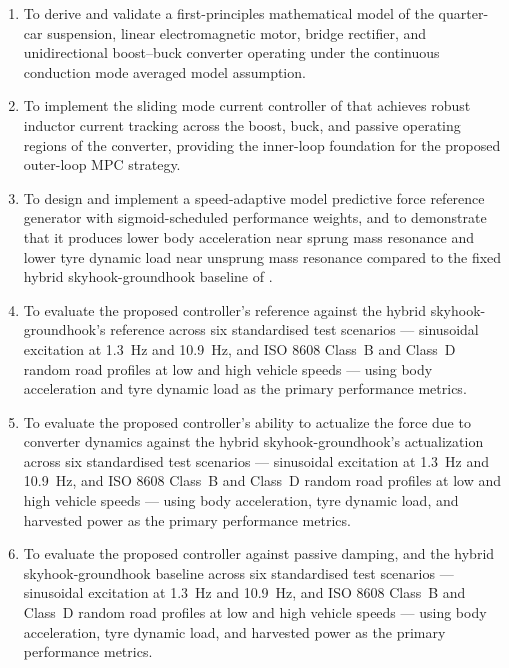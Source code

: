 \begin{enumerate}
    \item To derive and validate a first-principles mathematical model
          of the quarter-car suspension, linear electromagnetic motor,
          bridge rectifier, and unidirectional boost--buck converter
          operating under the continuous conduction mode averaged
          model assumption.
    \item To implement the sliding mode current controller of
          \cite{shi2019research} that achieves robust inductor current tracking
          across the boost, buck, and passive operating regions of the
          converter, providing the inner-loop foundation for the
          proposed outer-loop MPC strategy.
    \item To design and implement a speed-adaptive model predictive
          force reference generator with sigmoid-scheduled performance
          weights, and to demonstrate that it produces lower body
          acceleration near sprung mass resonance and lower tyre dynamic
          load near unsprung mass resonance compared to the fixed
          hybrid skyhook-groundhook baseline of \cite{shi2019research}.
        \item To evaluate the proposed controller's reference against the hybrid skyhook-groundhook's reference across six standardised test scenarios — sinusoidal
          excitation at \SI{1.3}{\hertz} and \SI{10.9}{\hertz}, and
          ISO 8608 Class~B and Class~D random road profiles at low and
          high vehicle speeds — using body acceleration and tyre dynamic
          load as the primary performance metrics.
    \item To evaluate the proposed controller's ability to actualize the force due to converter dynamics against the hybrid skyhook-groundhook's actualization
           across six standardised test scenarios — sinusoidal
          excitation at \SI{1.3}{\hertz} and \SI{10.9}{\hertz}, and
          ISO 8608 Class~B and Class~D random road profiles at low and
          high vehicle speeds — using body acceleration, tyre dynamic
          load, and harvested power as the primary performance metrics.
    \item To evaluate the proposed controller against passive damping, and the hybrid skyhook-groundhook
          baseline across six standardised test scenarios — sinusoidal
          excitation at \SI{1.3}{\hertz} and \SI{10.9}{\hertz}, and
          ISO 8608 Class~B and Class~D random road profiles at low and
          high vehicle speeds — using body acceleration, tyre dynamic
          load, and harvested power as the primary performance metrics.
\end{enumerate}